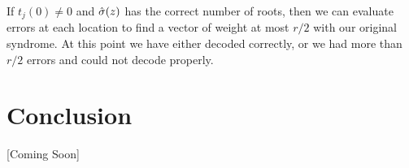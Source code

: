 \documentclass{article}
\begin{document}
If $t_{j}(0) \neq 0$ and $\Hat{\sigma}(z)$ has the correct number of roots, then we can evaluate errors at each location to find a vector of weight at most $r/2$ with our original syndrome. At this point we have either decoded correctly, or we had more than $r/2$ errors and could not decode properly.

\section{Conclusion}
[Coming Soon]
\end{document}
